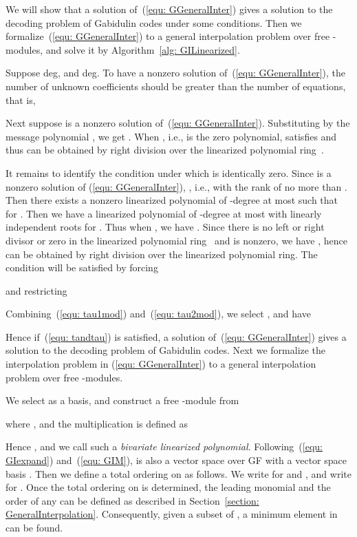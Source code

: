 \documentclass[11pt,onecolumn,draftcls]{IEEEtran}
\begin{document}
We will show that a solution of~(\ref{equ: GGeneralInter}) gives a solution to the decoding problem of Gabidulin codes under some conditions. Then we formalize~(\ref{equ: GGeneralInter}) to a general interpolation problem over free -modules, and solve it by Algorithm~\ref{alg: GILinearized}.

Suppose deg, and deg. To have a nonzero solution of~(\ref{equ: GGeneralInter}), the number of unknown coefficients should be greater than the number of equations, that is,

Next suppose  is a nonzero solution of~(\ref{equ: GGeneralInter}). Substituting  by the message polynomial , we get . When , i.e.,  is the zero polynomial,  satisfies  and thus can be obtained by right division over the linearized polynomial ring~\cite{kotter_it08}.

It remains to identify the condition under which  is identically zero. Since  is a nonzero solution of (\ref{equ: GGeneralInter}), , i.e.,  with the rank of  no more than . Then there exists a nonzero linearized polynomial  of -degree at most  such that  for . Then we have a linearized polynomial  of -degree at most  with  linearly independent roots  for . Thus when , we have . Since there is no left or right divisor or zero in the linearized polynomial ring~\cite{ore_ams33} and  is nonzero, we have , hence  can be obtained by right division over the linearized polynomial ring. The condition  will be satisfied by forcing

and restricting

Combining~(\ref{equ: tau1mod}) and~(\ref{equ: tau2mod}), we select , and have

Hence if~(\ref{equ: tandtau}) is satisfied, a solution of~(\ref{equ: GGeneralInter}) gives a solution to the decoding problem of Gabidulin codes. Next we formalize the interpolation problem in (\ref{equ: GGeneralInter}) to a general interpolation problem over free -modules.

We select  as a basis, and construct a free -module  from

where , and the multiplication  is defined as

Hence , and we call such  a  \emph{bivariate linearized polynomial}. Following~(\ref{equ: GIexpand}) and~(\ref{equ: GIM}),  is also a vector space over GF with a vector space basis . Then we define a total ordering on  as follows. We write  for  and , and write  for . Once the total ordering on  is determined, the leading monomial and the order of any  can be defined as described in Section~\ref{section: GeneralInterpolation}. Consequently, given a subset of , a minimum element in  can be found.
\end{document}
